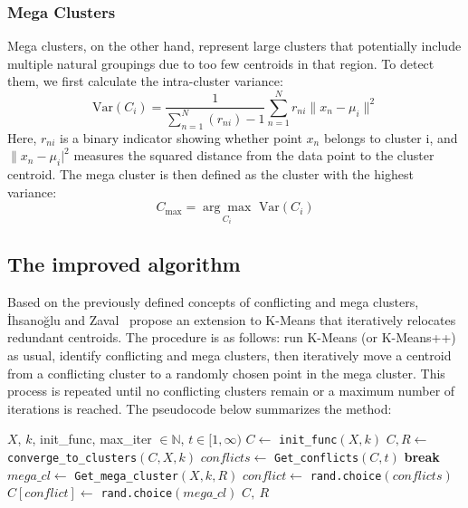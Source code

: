 \documentclass[10pt,twocolumn,letterpaper]{article}
\begin{document}
\subsubsection{Mega Clusters}

Mega clusters, on the other hand, represent large clusters that potentially
include multiple natural groupings due to too few centroids in that region. To
detect them, we first calculate the intra-cluster variance:
\begin{equation}
    \label{eq:cluster-var}
    \text{Var}(C_i) = \frac{1}{\sum_{n=1}^{N} (r_{ni}) - 1} \sum_{n=1}^{N} r_{ni} \|x_n - \mu_i\|^2
\end{equation}
Here, $r_{ni}$ is a binary indicator showing whether point $x_n$ belongs to
cluster i, and $\|x_n - \mu_i|^2$ measures the squared distance from the data
point to the cluster centroid. The mega cluster is then defined as the cluster
with the highest variance:
\begin{equation}
    \label{eq:mega-cluster}
    C_{\max} = \underset{C_i}{\arg\max}\text{ Var}(C_i)
\end{equation}


\subsection{The improved algorithm}\label{subsec:the-improved-algorithm}

Based on the previously defined concepts of conflicting and mega clusters,
İhsanoğlu and Zaval~\cite{Abdullah10601123} propose an extension to K-Means
that iteratively relocates redundant centroids. The procedure is as follows:
run K-Means (or K-Means++) as usual, identify conflicting and mega clusters,
then iteratively move a centroid from a conflicting cluster to a randomly
chosen point in the mega cluster. This process is repeated until no conflicting
clusters remain or a maximum number of iterations is reached. The pseudocode
below summarizes the method:

\begin{algorithmic}[1]
    \label{alg:imprv-kmeans}
    \Require $X$, $k$, init\_func, max\_iter $ \in \mathbb{N}$, $t \in [1, \infty)$
    \State $C \gets$ \texttt{init\_func}$(X, k)$
    \State
    \State $C,R \gets$ \texttt{converge\_to\_clusters}$(C, X, k)$
    \State
    \State $conflicts \gets$ \texttt{Get\_conflicts}$(C, t)$
    \State
    \State \textbf{break}
    \EndIf
    \State
    \State $mega\_cl \gets$ \texttt{Get\_mega\_cluster}$(X, k, R)$
    \State
    \State $conflict \gets$ \texttt{rand.choice}$(conflicts)$
    \State $C[conflict] \gets$ \texttt{rand.choice}$(mega\_cl)$
    \EndFor
    \State \Return $C,~R$
\end{algorithmic}
\end{document}
